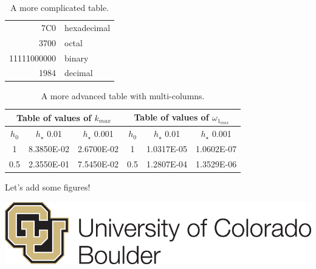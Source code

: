 \documentclass{article}
\begin{document}
\begin{table}[ht] %
\centering %
\begin{tabular}{|r|l|}
  \hline
  7C0 & hexadecimal \\
  3700 & octal \\ \cline{2-2} %
  11111000000 & binary \\
  \hline \hline
  1984 & decimal \\
  \hline
\end{tabular}
\caption{A more complicated table.}
\end{table}

\begin{table}[ht] %
    \centering
    \begin{tabular}{|c|c|c|c|c|c|}
    \hline
    \multicolumn{3}{|c|}{Table of values of $k_{max}$} & \multicolumn{3}{|c|}{Table of values of $\omega_{1_{max}}$} \\ \hline
    $h_0$    & $h_{\star}$ 0.01 & $h_{\star}$ 0.001 & $h_0$    & $h_{\star}$ 0.01 & $h_{\star}$ 0.001 \\ \hline
    1     & 8.3850E-02 & 2.6700E-02 & 1     & 1.0317E-05 & 1.0602E-07 \\ \hline
    0.5   & 2.3550E-01 & 7.5450E-02 & 0.5   & 1.2807E-04 & 1.3529E-06 \\ \hline
    \end{tabular}
    \caption{A more advanced table with multi-columns.}
  \label{tab:ABoringTable}
\end{table}

\clearpage %
Let's add some figures!

\vspace{3em}

\includegraphics[scale=0.5]{Images/CUBoulderLogo.png}
\end{document}
